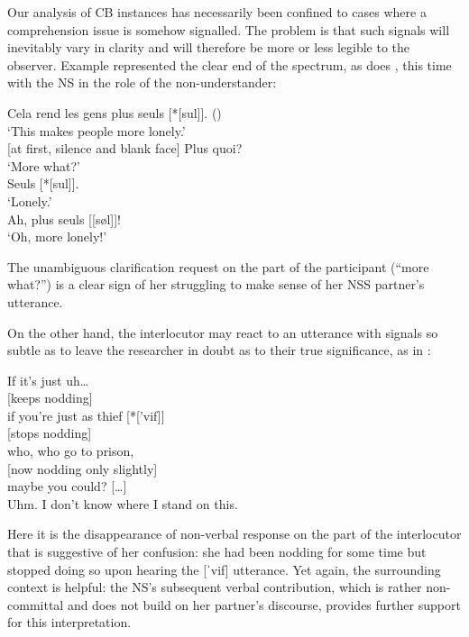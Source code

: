 \documentclass[output=paper,colorlinks,citecolor=brown,modfonts,nonflat]{../langscibook}
\begin{document}
Our analysis of CB instances has necessarily been confined to cases where a comprehension issue is somehow signalled. The problem is that such signals will inevitably vary in clarity and will therefore be more or less legible to the observer. Example  represented the clear end of the spectrum, as does , this time with the NS in the role of the non-understander:

\ea\label{ex:scheuer:15}
{\NNS} {Cela} {rend} {les} {gens} {plus} {seuls} [*[sul]].    ()\\
{\TRS}‘This makes people more lonely.’\\
{\NS} [at first, silence and blank face] {Plus} {quoi?}\\
{\TRS}  ‘More what?’\\
  {\NNS} {Seuls} [*[sul]].\\
{\TRS}  {‘}Lonely.’\\
  {\NS} {Ah,} {plus} {seuls} [[søl]]!\\
{\TRS}  ‘Oh, more lonely!’
\z

The unambiguous clarification request on the part of the  participant (“more what?”) is a clear sign of her struggling to make sense of her NSS partner’s utterance.

On the other hand, the interlocutor may react to an utterance with signals so subtle as to leave the researcher in doubt as to their true significance, as in : 

\ea\label{ex:scheuer:16}
{\NNS} {If} {it’s} {just} {uh…}\\
{\NS} [keeps nodding] \\
{\NNS} {if} {you’re} {just} {as} {thief} [*[{}'vif]]\\
{\NS} [stops nodding]\\
{\NNS} {who,} {who} {go} {to} {prison,}\\
{\NS} [now nodding only slightly]\\
{\NNS} {maybe} {you} {could?} {[…]}\\
{\NS} {Uhm.} {I} {don’t} {know} {where} {I} {stand} {on} {this.}
\z

Here it is the disappearance of non-verbal response on the part of the interlocutor that is suggestive of her confusion: she had been nodding for some time but stopped doing so upon hearing the [ˈvif] utterance. Yet again, the surrounding context is helpful: the NS’s subsequent verbal contribution, which is rather non-committal and does not build on her partner’s discourse, provides further support for this interpretation.
\end{document}

